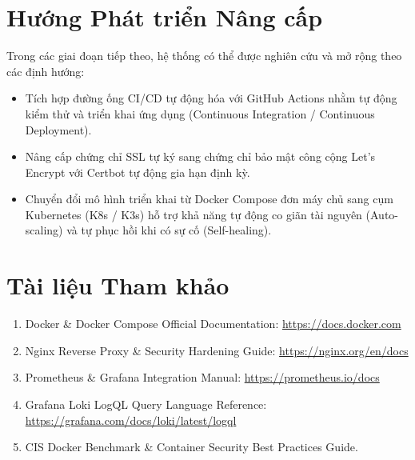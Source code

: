 \documentclass[12pt,a4paper,oneside]{report}
\begin{document}
\section{Hướng Phát triển Nâng cấp}
Trong các giai đoạn tiếp theo, hệ thống có thể được nghiên cứu và mở rộng theo các định hướng:
\begin{itemize}[itemsep=1pt, topsep=1.5pt, parsep=0pt]
    \item Tích hợp đường ống CI/CD tự động hóa với GitHub Actions nhằm tự động kiểm thử và triển khai ứng dụng (Continuous Integration / Continuous Deployment).
    \item Nâng cấp chứng chỉ SSL tự ký sang chứng chỉ bảo mật công cộng Let's Encrypt với Certbot tự động gia hạn định kỳ.
    \item Chuyển đổi mô hình triển khai từ Docker Compose đơn máy chủ sang cụm Kubernetes (K8s / K3s) hỗ trợ khả năng tự động co giãn tài nguyên (Auto-scaling) và tự phục hồi khi có sự cố (Self-healing).
\end{itemize}

\section*{Tài liệu Tham khảo}
\begin{enumerate}[itemsep=1pt, topsep=1.5pt, parsep=0pt]
    \item Docker \& Docker Compose Official Documentation: \url{https://docs.docker.com}
    \item Nginx Reverse Proxy \& Security Hardening Guide: \url{https://nginx.org/en/docs}
    \item Prometheus \& Grafana Integration Manual: \url{https://prometheus.io/docs}
    \item Grafana Loki LogQL Query Language Reference:\\ \url{https://grafana.com/docs/loki/latest/logql}
    \item CIS Docker Benchmark \& Container Security Best Practices Guide.
\end{enumerate}
\endgroup

\newpage
\thispagestyle{fancy}
\vspace*{60pt}
\end{document}
